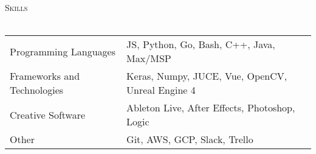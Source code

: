 \documentclass[11pt]{extarticle}
\newcommand{\lineunder} {
	\vspace*{-8pt} \\
	\hspace*{-18pt} \hrulefill \\
}
\newcommand{\header} [1] {
	{\hspace*{-18pt}\vspace*{6pt} \textsc{#1}}
	\vspace*{-6pt} \lineunder
}
\begin{document}
\noindent
\header{Skills}
\noindent

\begin{tabular}{ l l }
	Programming Languages & JS, Python, Go, Bash, C++, Java, Max/MSP \\
	Frameworks and Technologies & Keras, Numpy, JUCE, Vue, OpenCV, Unreal Engine 4 \\
	Creative Software             & Ableton Live, After Effects, Photoshop, Logic    \\
	Other                  & Git, AWS, GCP, Slack, Trello       \\
\end{tabular}
\vspace{2mm}
\noindent
\begin{center}
\end{center}
\end{document}
